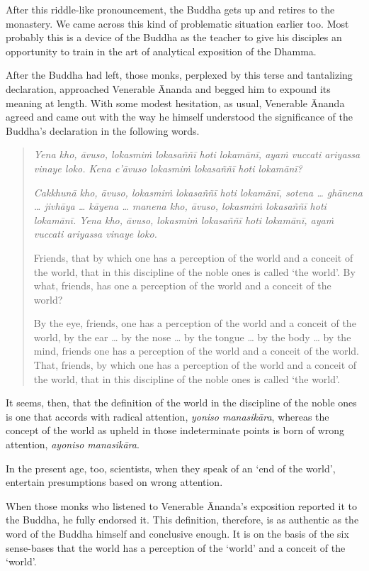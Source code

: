 After this riddle-like pronouncement, the Buddha gets up and retires to the monastery. We came across this kind of problematic situation earlier too. Most probably this is a device of the Buddha as the teacher to give his disciples an opportunity to train in the art of analytical exposition of the Dhamma.

After the Buddha had left, those monks, perplexed by this terse and tantalizing declaration, approached Venerable Ānanda and begged him to expound its meaning at length. With some modest hesitation, as usual, Venerable Ānanda agreed and came out with the way he himself understood the significance of the Buddha's declaration in the following words.

\begin{quote}
\emph{Yena kho, āvuso, lokasmiṁ lokasaññī hoti lokamānī, ayaṁ vuccati ariyassa vinaye loko. Kena c'āvuso lokasmiṁ lokasaññī hoti lokamānī?}

\emph{Cakkhunā kho, āvuso, lokasmiṁ lokasaññī hoti lokamānī, sotena \ldots{} ghānena \ldots{} jivhāya \ldots{} kāyena \ldots{} manena kho, āvuso, lokasmiṁ lokasaññī hoti lokamānī. Yena kho, āvuso, lokasmiṁ lokasaññī hoti lokamānī, ayaṁ vuccati ariyassa vinaye loko.}

Friends, that by which one has a perception of the world and a conceit of the world, that in this discipline of the noble ones is called `the world'. By what, friends, has one a perception of the world and a conceit of the world?

By the eye, friends, one has a perception of the world and a conceit of the world, by the ear \ldots{} by the nose \ldots{} by the tongue \ldots{} by the body \ldots{} by the mind, friends one has a perception of the world and a conceit of the world. That, friends, by which one has a perception of the world and a conceit of the world, that in this discipline of the noble ones is called `the world'.
\end{quote}

It seems, then, that the definition of the world in the discipline of the noble ones is one that accords with radical attention, \emph{yoniso manasikāra}, whereas the concept of the world as upheld in those indeterminate points is born of wrong attention, \emph{ayoniso manasikāra}.

In the present age, too, scientists, when they speak of an `end of the world', entertain presumptions based on wrong attention.

When those monks who listened to Venerable Ānanda's exposition reported it to the Buddha, he fully endorsed it. This definition, therefore, is as authentic as the word of the Buddha himself and conclusive enough. It is on the basis of the six sense-bases that the world has a perception of the `world' and a conceit of the `world'.

